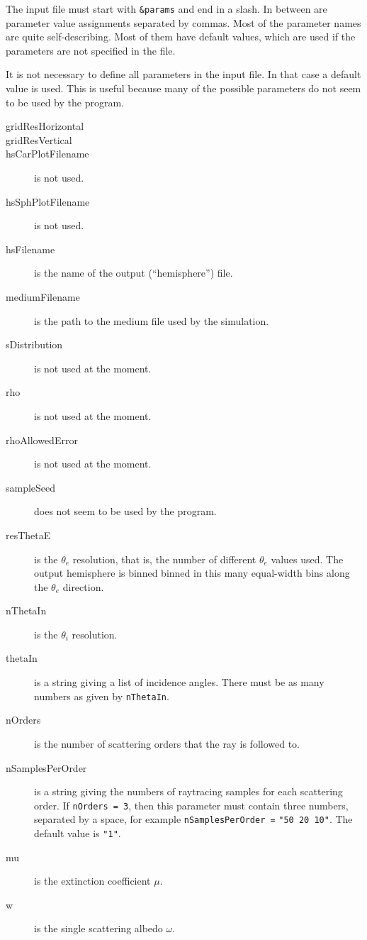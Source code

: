 \documentclass[a4paper]{article}
\newcommand{\code}[1]{\lstinline{#1}}
\begin{document}
The input file must start with \code{&params} and end in a slash. In between are parameter value assignments separated by commas. Most of the parameter names are quite self-describing. Most of them have default values, which are used if the parameters are not specified in the file.

It is not necessary to define all parameters in the input file. In that case a default value is used. This is useful because many of the possible parameters do not seem to be used by the program.

\begin{description}
	\item[gridResHorizontal]
	\item[gridResVertical]
	\item[hsCarPlotFilename] is not used.
	\item[hsSphPlotFilename] is not used.
	\item[hsFilename] is the name of the output (``hemisphere'') file.
	\item[mediumFilename] is the path to the medium file used by the simulation.
	\item[sDistribution] is not used at the moment.
	\item[rho] is not used at the moment.
	\item[rhoAllowedError] is not used at the moment.
	\item[sampleSeed] does not seem to be used by the program.
	\item[resThetaE] is the $\theta_e$ resolution, that is, the number of different $\theta_e$ values used. The output hemisphere is binned binned in this many equal-width bins along the $\theta_e$ direction.
	\item[nThetaIn] is the $\theta_i$ resolution.
	\item[thetaIn] is a string giving a list of incidence angles. There must be as many numbers as given by \code{nThetaIn}.
	\item[nOrders] is the number of scattering orders that the ray is followed to.
	\item[nSamplesPerOrder] is a string giving the numbers of raytracing samples for each scattering order. If \code{nOrders = 3}, then this parameter must contain three numbers, separated by a space, for example \code{nSamplesPerOrder =} \code{"50 20 10"}. The default value is \code{"1"}.
	\item[mu] is the extinction coefficient $\mu$.
	\item[w] is the single scattering albedo $\omega$.


\end{description}
\end{document}
